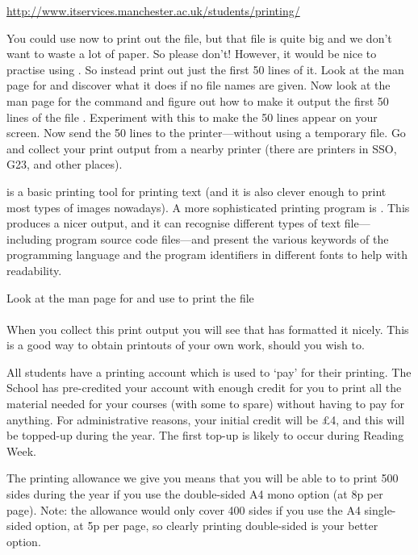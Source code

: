 {\small
\url{http://www.itservices.manchester.ac.uk/students/printing/}
}

You could use  now to print out the 
file, but that file is quite big and we don't want to waste a lot of
paper. So please don't! However, it would be nice to practise using
. So instead print out just the first 50 lines of
it. Look at the man page for  and discover what it does
if no file names are given. Now look at the man page for the command
 and figure out how to make it output the first 50 lines
of the file .  Experiment with this to make the 50
lines appear on your screen.
Now send the 50 lines to the
printer---without using a temporary file. Go and collect your print output
from a nearby printer (there are printers in SSO, G23, and other places).
%

 is a basic printing tool for printing text (and it is also
clever enough to print most types of images nowadays). A more sophisticated
printing program is . This produces a nicer output, and it
can recognise different types of text file---including program
source code files---and present the various keywords of the programming
language and the program identifiers in different fonts to help with
readability.

Look at the man page for  and use  to print the file
\\

\\

When you collect
this print output you will see that  has formatted it nicely. This is a
good way to obtain printouts of your own work, should you wish to.

All students have a printing account which is used to `pay' for their printing. The School has pre-credited your account with enough credit for you to print all the material needed for your courses (with some to spare) without having to pay for anything. For administrative reasons, your initial credit will be \pounds4, and this will be topped-up during the year. The first top-up is likely to occur during Reading Week.

The printing allowance we give you means that you will be able to to print 500 sides during the year if you use the double-sided A4 mono option (at 8p per page). Note: the allowance would only cover 400 sides if you use the A4 single-sided option, at 5p per page, so clearly printing double-sided is your better option.

